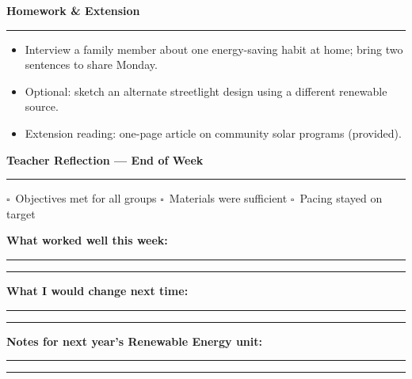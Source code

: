 \documentclass[11pt,a4paper,parskip=half]{scrartcl}
\newcommand{\plansection}[2]{%
  \vspace{12pt}%
  {\color{stemteal}\Large\bfseries #1\ \textcolor{stemamber}{\normalsize\faIcon{#2}}}\par
  {\color{stemamber}\rule{\linewidth}{1.1pt}}\par
  \vspace{4pt}%
}
\newcommand{\ckbox}{\textcolor{stemteal}{$\square$}}
\begin{document}
\plansection{Homework \& Extension}{book}

\begin{itemize}[leftmargin=16pt,itemsep=3pt]
  \small
  \item Interview a family member about one energy-saving habit at home; bring two sentences to share Monday.
  \item Optional: sketch an alternate streetlight design using a different renewable source.
  \item Extension reading: one-page article on community solar programs (provided).
\end{itemize}

\plansection{Teacher Reflection --- End of Week}{pen}

\noindent
\ckbox\ Objectives met for all groups\qquad
\ckbox\ Materials were sufficient\qquad
\ckbox\ Pacing stayed on target
\vspace{6pt}

\textbf{\color{stemslate}What worked well this week:}\par
\rule{\textwidth}{0.4pt}\par
\vspace{4pt}\rule{\textwidth}{0.4pt}
\vspace{8pt}

\textbf{\color{stemslate}What I would change next time:}\par
\rule{\textwidth}{0.4pt}\par
\vspace{4pt}\rule{\textwidth}{0.4pt}
\vspace{8pt}

\textbf{\color{stemslate}Notes for next year's Renewable Energy unit:}\par
\rule{\textwidth}{0.4pt}\par
\vspace{4pt}\rule{\textwidth}{0.4pt}

\vspace{16pt}
\end{document}
